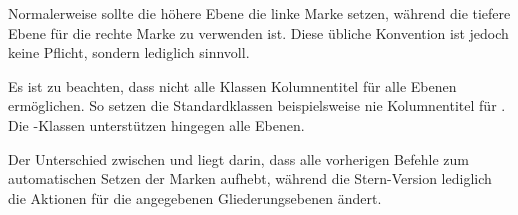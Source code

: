  Normalerweise sollte die höhere Ebene die linke Marke setzen, während die
  tiefere Ebene für die rechte Marke zu verwenden ist. Diese übliche
  Konvention ist jedoch keine Pflicht, sondern lediglich sinnvoll.

  Es ist zu beachten, dass nicht alle Klassen Kolumnentitel
  für alle Ebenen ermöglichen. So setzen die
  Standardklassen beispielsweise
  nie Kolumnentitel für . Die \KOMAScript-Klassen
  unterstützen hingegen alle Ebenen.

  Der Unterschied zwischen  und
   liegt darin, dass
   alle vorherigen Befehle zum automatischen Setzen der Marken
  aufhebt, während die Stern-Version  lediglich die Aktionen
  für die angegebenen Gliederungsebenen ändert.%
  \IfThisCommonLabelBase{scrlayer-scrpage}{}{ %
    \iffalse%
    Man kann so, wie in \autoref{sec:scrlayer-scrpage.pagestyle.content} ab
    \PageRefxmpl{scrlayer-scrpage.mark} gezeigt, auch relativ komplexe Fälle
    abdecken. %
    Beispiele für die Verwendung finden Sie in
    \autoref{sec:scrlayer-scrpage.pagestyle.content} ab
    \PageRefxmpl{scrlayer-scrpage.mark}. %
    \fi%
  }%
    \iffalse%
      \iffree{}{\par
        Das veraltete Paket
        \Package{scrpage2}\IndexPackage{scrpage2}\important{\Package{scrpage2}}
        kennt sowohl \Macro{manualmark} als auch \Macro{automark}, jedoch nicht
        \Macro{automark*}. Daher sind die nachfolgenden Beispielen nicht
        vollständig auf die Verwendung von \Package{scrpage2} übertragbar.%
      }%
    \fi
